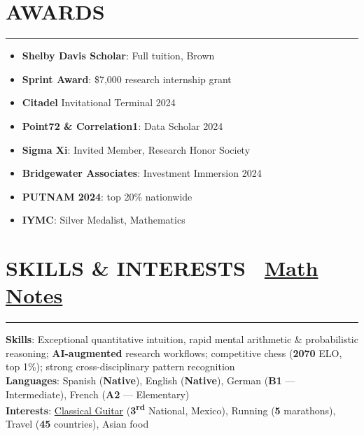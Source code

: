 \documentclass[10.5pt]{article}
\begin{document}
\section*{\fontsize{11.5pt}{13pt}\selectfont\bfseries\MakeUppercase AWARDS}
\vspace{2pt}
\hrule
\vspace{1pt}
\begin{minipage}[t]{0.48\linewidth}
\begin{itemize}[itemsep=1pt]
  \item \textbf{Shelby Davis Scholar}: Full tuition, Brown
  \item \textbf{Sprint Award}: \$7,000 research internship grant
  \item \textbf{Citadel} Invitational Terminal 2024
  \item \textbf{Point72 \& Correlation1}: Data Scholar 2024
\end{itemize}
\end{minipage}
\hfill
\begin{minipage}[t]{0.48\linewidth}
\begin{itemize}[itemsep=1pt]
  \item \textbf{Sigma Xi}: Invited Member, Research Honor Society
  \item \textbf{Bridgewater Associates}: Investment Immersion 2024
  \item \textbf{PUTNAM 2024}: top 20\% nationwide
  \item \textbf{IYMC}: Silver Medalist, Mathematics
\end{itemize}
\end{minipage}
\vspace{1pt}
\section*{\fontsize{11.5pt}{13pt}\selectfont\bfseries\MakeUppercase SKILLS \& INTERESTS \hfill \normalsize {}\ \href{https://eugenio-macias.github.io/notes}{\textbf{\small Math Notes}}}
\vspace{2pt}
\hrule
\vspace{1pt}
\textbf{Skills}: Exceptional quantitative intuition, rapid mental arithmetic \& probabilistic reasoning; \textbf{AI-augmented} research workflows; competitive chess (\textbf{2070} ELO, top 1\%); strong cross-disciplinary pattern recognition \\
\textbf{Languages}: Spanish (\textbf{Native}), English (\textbf{Native}), German (\textbf{B1} --- Intermediate), French (\textbf{A2} --- Elementary) \\
\textbf{Interests}: \href{https://eugenio-macias.github.io/music-repertoire}{Classical Guitar} (\textbf{3\textsuperscript{rd}} National, Mexico), Running (\textbf{5} marathons), Travel (\textbf{45} countries), Asian food
\end{document}
